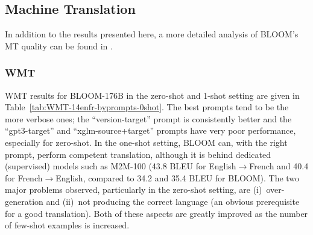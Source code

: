 \documentclass[twoside,11pt]{article}
\begin{document}
\subsection{Machine Translation}
\label{sec:eval:mt}

In addition to the results presented here, a more detailed analysis of BLOOM's MT quality can be found in \citep{bawden-yvon-2023-mt-bloom}.

\subsubsection{WMT}
\label{sec:eval:mt:wmt}

WMT results for BLOOM-176B in the zero-shot and 1-shot setting are given in Table~\ref{tab:WMT-14enfr-byprompts-0shot}.
The best prompts tend to be the more verbose ones; the ``version-target'' prompt is consistently better and the ``gpt3-target'' and ``xglm-source+target'' prompts have very poor performance, especially for zero-shot. In the one-shot setting, BLOOM can, with the right prompt, perform competent translation, although it is behind dedicated (supervised) models such as M2M-100 (43.8 BLEU for English$\rightarrow$French and 40.4 for French$\rightarrow$English, compared to 34.2 and 35.4 BLEU for BLOOM).
The two major problems observed, particularly in the zero-shot setting, are (i)~over-generation and (ii)~not producing the correct language (an obvious prerequisite for a good translation). Both of these aspects are greatly improved as the number of few-shot examples is increased. %
\end{document}
